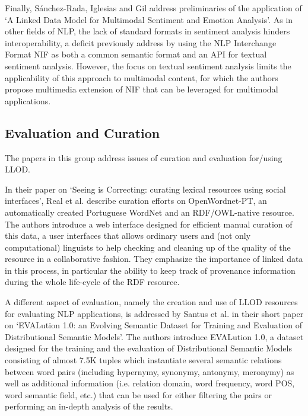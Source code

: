 Finally, Sánchez-Rada, Iglesias and Gil address preliminaries of the application of `A Linked Data Model for Multimodal Sentiment and Emotion Analysis'.
As in other fields of NLP, the lack of standard formats in sentiment analysis hinders interoperability, a deficit previously address by using the NLP Interchange Format NIF as both a common semantic format and an API for textual sentiment analysis. However, the focus on textual sentiment analysis limits the applicability of this approach to multimodal content, for which the authors propose multimedia extension of NIF that can be leveraged for multimodal applications. 

\subsection{Evaluation and Curation}

The papers in this group address issues of curation and evaluation for/using LLOD.

In their paper on `Seeing is Correcting: curating lexical resources using social interfaces', Real et al. describe curation efforts on OpenWordnet-PT, an automatically created Portuguese WordNet and an RDF/OWL-native resource. 
The authors introduce a web interface designed for efficient manual curation of this data, a user interfaces that allows ordinary users and (not only computational) linguists to help checking and cleaning up of the quality of the resource in a collaborative fashion. They emphasize the importance of linked data in this process, in particular the ability to keep track of provenance information during the whole life-cycle of the RDF resource.

A different aspect of evaluation, namely the creation and use of LLOD resources for evaluating NLP applications, is addressed by Santus et al. in their short paper on `EVALution 1.0: an Evolving Semantic Dataset for Training and Evaluation of Distributional Semantic Models'. 
The authors introduce EVALution 1.0, a dataset designed for the training and the evaluation of Distributional Semantic Models consisting of almost 7.5K tuples which instantiate several semantic relations between word pairs (including hypernymy, synonymy, antonymy, meronymy) as well as additional information (i.e. relation domain, word frequency, word POS, word semantic field, etc.) that can be used for either filtering the pairs or performing an in-depth analysis of the results. 

